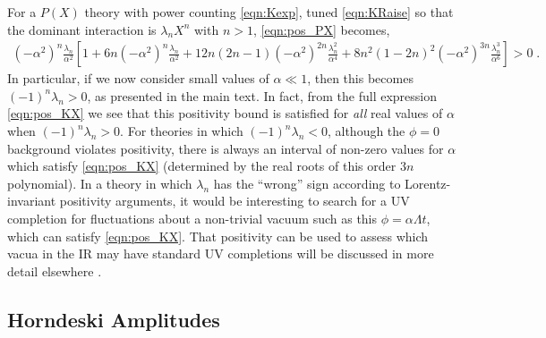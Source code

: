 \documentclass[11pt]{article}
\begin{document}
For a $P(X)$ theory with power counting \eqref{eqn:Kexp}, tuned \eqref{eqn:KRaise} so that the dominant interaction is $\lambda_n X^n$ with $n > 1$, \eqref{eqn:pos_PX} becomes,
\begin{align}
(-\alpha^2)^{n} \frac{ \lambda_n }{ \alpha^2 } \left[ 
1 
+ 6n (- \alpha^2 )^{n} \frac{\lambda_n}{\alpha^2}
 + 12 n (2n -1 ) ( - \alpha^2 )^{2n }  \frac{ \lambda_n^2  }{\alpha^4}
 +  8 n^2  (1 - 2 n)^2 (-  \alpha^2 )^{3 n} \frac{ \lambda_n^3 }{\alpha^6}
 \right] > 0  \; .
 \label{eqn:pos_KX}
\end{align}
In particular, if we now consider small values of $\alpha \ll 1$, then this becomes $(-1)^n \lambda_n > 0$, as presented in the main text. In fact, from the full expression \eqref{eqn:pos_KX} we see that this positivity bound is satisfied for \emph{all} real values of $\alpha$ when $(-1)^n \lambda_n > 0$. For theories in which $(-1)^n \lambda_n < 0$, although the $\phi = 0$ background violates positivity, there is always an interval of non-zero values for $\alpha$ which satisfy \eqref{eqn:pos_KX} (determined by the real roots of this order $3n$ polynomial). 
In a theory in which $\lambda_n$ has the ``wrong'' sign according to Lorentz-invariant positivity arguments, it would be interesting to search for a UV completion for fluctuations about a non-trivial vacuum such as this $\phi = \alpha \Lambda t$, which can satisfy \eqref{eqn:pos_KX}. 
That positivity can be used to assess which vacua in the IR may have standard UV completions will be discussed in more detail elsewhere \cite{Noller:2021toappear}. 


\subsection{Horndeski Amplitudes}
\label{app:pos_WBG}


\end{document}
